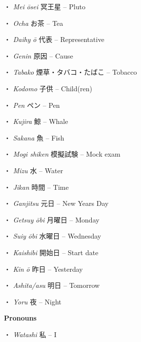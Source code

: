 \par{・ \emph{Mei }\emph{ōsei }冥王星 – Pluto }

\par{・ \emph{Ocha }お茶 – Tea }

\par{・ \emph{Daihy }\emph{ō }代表 – Representative }

\par{・ \emph{Gen\textquotesingle in }原因 – Cause }

\par{・ \emph{Tabako }煙草・タバコ・たばこ – Tobacco }

\par{・ \emph{Kodomo }子供 – Child(ren) }

\par{・ \emph{Pen }ペン – Pen }
 
\par{・ \emph{Kujira }鯨 – Whale }

\par{・ \emph{Sakana }魚 – Fish }

\par{・ \emph{Mogi shiken }模擬試験 – Mock exam }

\par{・ \emph{Mizu }水 – Water }

\par{・ \emph{Jikan }時間 – Time }

\par{・ \emph{Ganjitsu }元日 – New Year\textquotesingle s Day }

\par{・ \emph{Getsuy }\emph{ōbi }月曜日 – Monday }

\par{・ \emph{Suiy }\emph{ōbi }水曜日 – Wednesday }

\par{・ \emph{Kaishibi }開始日 – Start date }

\par{・ \emph{Kin }\emph{ō }昨日 – Yesterday }

\par{・ \emph{Ashita\slash asu }明日 – Tomorrow }

\par{・ \emph{Yoru }夜 – Night }

\par{\textbf{Pronouns }}

\par{・ \emph{Watashi }私 – I }
 
